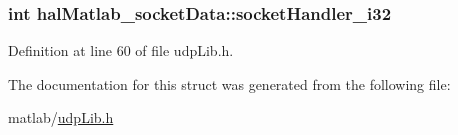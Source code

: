 \hypertarget{structhalMatlab__socketData_a60bb1e30d40ee435f1f9501933aba991_a60bb1e30d40ee435f1f9501933aba991}{
\subsubsection[{socket\+Handler\+\_\+i32}]{\setlength{\rightskip}{0pt plus 5cm}int hal\+Matlab\+\_\+socket\+Data\+::socket\+Handler\+\_\+i32}}\label{structhalMatlab__socketData_a60bb1e30d40ee435f1f9501933aba991_a60bb1e30d40ee435f1f9501933aba991}


Definition at line 60 of file udp\+Lib.\+h.



The documentation for this struct was generated from the following file\+:\begin{DoxyCompactItemize}
\item 
matlab/\hyperlink{udpLib_8h}{udp\+Lib.\+h}\end{DoxyCompactItemize}
